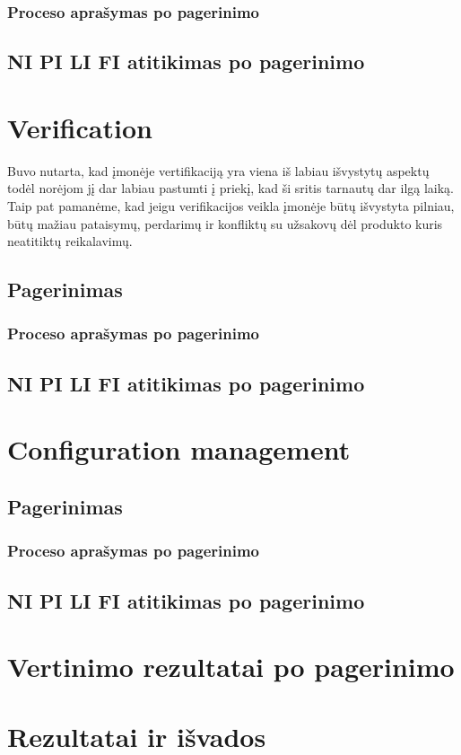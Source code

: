 \documentclass{VUMIFPSkursinis}
\begin{document}
			\subsubsection{Proceso aprašymas po pagerinimo}
		\subsection{NI PI LI FI atitikimas po pagerinimo}
	\section{Verification}
		Buvo nutarta, kad įmonėje vertifikaciją yra viena iš labiau išvystytų aspektų todėl norėjom jį dar labiau pastumti į priekį, kad ši sritis tarnautų dar ilgą laiką. 
		Taip pat pamanėme, kad jeigu verifikacijos veikla įmonėje būtų išvystyta pilniau, būtų mažiau pataisymų, perdarimų ir konfliktų su užsakovų dėl produkto kuris neatitiktų reikalavimų.
		\subsection{Pagerinimas}
			\subsubsection{Proceso aprašymas po pagerinimo}
		\subsection{NI PI LI FI atitikimas po pagerinimo}
	\section{Configuration management}
		\subsection{Pagerinimas}
			\subsubsection{Proceso aprašymas po pagerinimo}
		\subsection{NI PI LI FI atitikimas po pagerinimo}
	\section{Vertinimo rezultatai po pagerinimo}
	\section{Rezultatai ir išvados}
\end{document}
